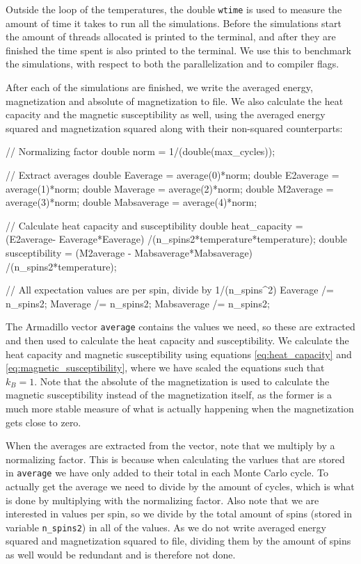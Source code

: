 \documentclass[reprint,english,notitlepage]{revtex4-1}  %
\begin{document}
Outside the loop of the temperatures, the double \verb+wtime+ is used to measure the amount of time it takes to run all the simulations. Before the simulations start the amount of threads allocated is printed to the terminal, and after they are finished the time spent is also printed to the terminal. We use this to benchmark the simulations, with respect to both the parallelization and to compiler flags.

After each of the simulations are finished, we write the averaged energy, magnetization and absolute of magnetization to file. We also calculate the heat capacity and the magnetic susceptibility as well, using the averaged energy squared and magnetization squared along with their non-squared counterparts:

\begin{cpp}
// Normalizing factor
double norm = 1/(double(max_cycles));

// Extract averages
double Eaverage = average(0)*norm;
double E2average = average(1)*norm;
double Maverage = average(2)*norm;
double M2average = average(3)*norm;
double Mabsaverage = average(4)*norm;

// Calculate heat capacity and susceptibility
double heat_capacity = (E2average- Eaverage*Eaverage)
					   /(n_spins2*temperature*temperature);
double susceptibility = (M2average - Mabsaverage*Mabsaverage)
					    /(n_spins2*temperature);

// All expectation values are per spin, divide by 1/(n_spins^2)
Eaverage /= n_spins2;
Maverage /= n_spins2;
Mabsaverage /= n_spins2;
\end{cpp}

The Armadillo \citep{Armadillo} vector \verb+average+ contains the values we need, so these are extracted and then used to calculate the heat capacity and susceptibility. We calculate the heat capacity and magnetic susceptibility using equations \eqref{eq:heat_capacity} and \eqref{eq:magnetic_susceptibility}, where we have scaled the equations such that $k_B = 1$. Note that the absolute of the magnetization is used to calculate the magnetic susceptibility instead of the magnetization itself, as the former is a much more stable measure of what is actually happening when the magnetization gets close to zero.

When the averages are extracted from the vector, note that we multiply by a normalizing factor. This is because when calculating the varlues that are stored in \verb+average+ we have only added to their total in each Monte Carlo cycle. To actually get the average we need to divide by the amount of cycles, which is what is done by multiplying with the normalizing factor. Also note that we are interested in values per spin, so we divide by the total amount of spins (stored in variable \verb+n_spins2+) in all of the values. As we do not write averaged energy squared and magnetization squared to file, dividing them by the amount of spins as well would be redundant and is therefore not done.
\end{document}
